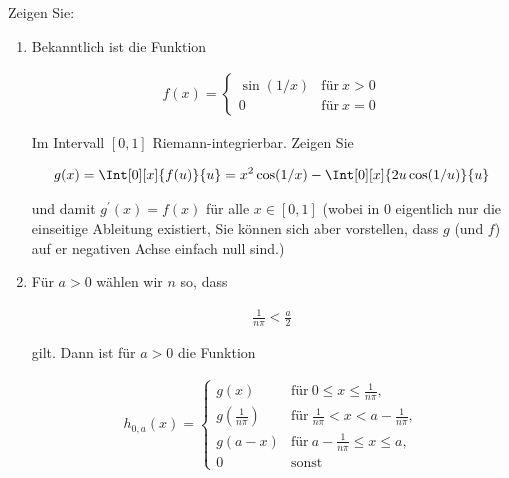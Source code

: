
\begin{exercise}

Zeigen Sie:

\begin{enumerate}[label = (\alph*)]

    \item Bekanntlich ist die Funktion
    
    \begin{align*}
        f(x)
        =
        \begin{cases}
            \sin(1 / x) & \text{für}~ x > 0 \\
            0         & \text{für}~ x = 0
        \end{cases}
    \end{align*}

    Im Intervall $[0, 1]$ Riemann-integrierbar.
    Zeigen Sie

    \begin{align*}
        g(x)
        =
        \Int[0][x]{f(u)}{u}
        =
        x^2 \cos(1 / x) - \Int[0][x]{2 u \cos(1/u)}{u}
    \end{align*}

    und damit $g^\prime(x) = f(x)$ für alle $x \in [0, 1]$ (wobei in $0$ eigentlich nur die einseitige Ableitung existiert, Sie können sich aber vorstellen, dass $g$ (und $f$) auf er negativen Achse einfach null sind.)

    \item Für $a > 0$ wählen wir $n$ so, dass
    
    \begin{align*}
        \frac{1}{n \pi} < \frac{a}{2}
    \end{align*}

    gilt.
    Dann ist für $a > 0$ die Funktion

    \begin{align*}
        h_{0, a}(x)
        =
        \begin{cases}
            g(x)               & \text{für}~ 0 \leq x \leq \frac{1}{n \pi}, \\
            g(\frac{1}{n \pi}) & \text{für}~ \frac{1}{n \pi} < x < a - \frac{1}{n \pi}, \\
            g(a - x)           & \text{für}~ a - \frac{1}{n \pi} \leq x \leq a, \\
            0                  & \text{sonst}
        \end{cases}
    \end{align*}


\end{enumerate}
\end{exercise}
